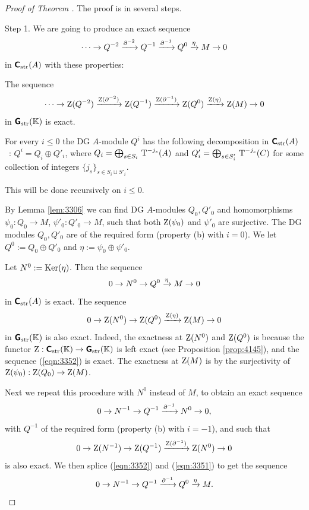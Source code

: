 \begin{proof}[Proof of Theorem \tup{\ref{thm:3305}}]
The proof is in several steps. 

\smallskip \noindent
Step 1. We are going to produce an exact sequence 
\begin{equation} \label{eqn:3350}
\cdots \to Q^{-2} \xrightarrow{\partial^{-2}} Q^{-1} \xrightarrow{\partial^{-1}}
Q^0 \xrightarrow{\eta} M \to 0
\end{equation}
in $\boldsymbol{\mathsf{C}}_{\mathrm{str}}(A)$ with these properties: 
\begin{itemize}
 The sequence 
\[ \cdots \to \operatorname{Z}(Q^{-2}) \xrightarrow{\operatorname{Z}(\partial^{-2})} \operatorname{Z}(Q^{-1}) 
\xrightarrow{\operatorname{Z}(\partial^{-1})} \operatorname{Z}(Q^0) \xrightarrow{\operatorname{Z}(\eta)} \operatorname{Z}(M) \to 0 \]
in $\boldsymbol{\mathsf{G}}_{\mathrm{str}}(\mathbb{K})$ is exact.

 For every $i \leq 0$ the DG $A$-module $Q^i$ has the following 
decomposition 
in $\boldsymbol{\mathsf{C}}_{\mathrm{str}}(A)$~: 
$Q^i = Q_i \oplus Q'_i$, where
$Q_i = \bigoplus_{s \in S_i} \, \operatorname{T}^{-j_s}(A)$
and 
$Q'_i = \lb \bigoplus_{s \in S'_i} \, \opn{T}^{-j_s}(C)$
for some collection of integers 
$\{ j_s \}_{s \in S_i \sqcup S'_i}$. 
\end{itemize}
This will be done recursively on $i \leq 0$. 

By Lemma \ref{lem:3306} we can find DG $A$-modules $Q_0, Q'_0$ 
and homomorphisms 
$\psi_0 : Q_0 \to M$, $\psi'_0 : Q'_0 \to M$, such that both 
$\operatorname{Z}(\psi_0)$ and $\psi'_0$ are surjective. 
The DG modules $Q_0, Q'_0$ are of the required 
form (property (b) with $i = 0$). We let 
$Q^0 := Q_0 \oplus Q'_0$ and $\eta := \psi_0 \oplus \psi'_0$. 

Let $N^0 := \operatorname{Ker}(\eta)$. Then the sequence 
\begin{equation} \label{eqn:3352}
0 \to N^0 \to Q^0 \xrightarrow{\eta} M \to 0 
\end{equation}
in $\boldsymbol{\mathsf{C}}_{\mathrm{str}}(A)$ is exact. The sequence 
\[ 0 \to \operatorname{Z}(N^0) \to \operatorname{Z}(Q^0) \xrightarrow{\operatorname{Z}(\eta)} \operatorname{Z}(M) \to 0 \]
in $\boldsymbol{\mathsf{G}}_{\mathrm{str}}(\mathbb{K})$ is also exact. Indeed, the exactness at 
$\operatorname{Z}(N^0)$ and $\operatorname{Z}(Q^0)$ is because the functor 
$\operatorname{Z} : \boldsymbol{\mathsf{C}}_{\mathrm{str}}(\mathbb{K}) \to \boldsymbol{\mathsf{G}}_{\mathrm{str}}(\mathbb{K})$
is left exact (see Proposition \ref{prop:4145}), and the sequence 
(\ref{eqn:3352}) is exact. 
The exactness at $\operatorname{Z}(M)$ is by the surjectivity of 
$\operatorname{Z}(\psi_0) : \operatorname{Z}(Q_0) \to \operatorname{Z}(M)$.

Next we repeat this procedure with $N^0$ instead of $M$, to obtain an exact 
sequence 
\begin{equation} \label{eqn:3351}
0 \to N^{-1} \to Q^{-1} \xrightarrow{\partial^{-1}} N^0 \to 0 ,
\end{equation}
with $Q^{-1}$ of the required form (property (b) with $i = -1$), and such that 
\[ 0 \to \operatorname{Z}(N^{-1}) \to \operatorname{Z}(Q^{-1}) \xrightarrow{\operatorname{Z}(\partial^{-1})} 
\operatorname{Z}(N^0) \to 0 \]
is also exact. We then splice (\ref{eqn:3352}) and (\ref{eqn:3351})
to get the sequence 
\[ 0 \to N^{-1} \to Q^{-1} \xrightarrow{\partial^{-1}} Q^0 \xrightarrow{\eta} M . \]


\end{proof}
